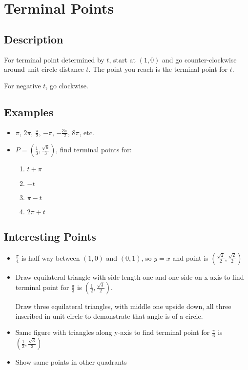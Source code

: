 \documentclass{exam}
\begin{document}
  \section{Terminal Points}

  \subsection{Description}
  For terminal point determined by $t$, start at $(1, 0)$ and go counter-clockwise around unit circle distance $t$.  The
  point you reach is the terminal point for $t$.

  For negative $t$, go clockwise.

  \subsection{Examples}
  \begin{itemize}
    \item $\pi$, $2 \pi$, $\frac{\pi}{2}$, $-\pi$, $-\frac{3 \pi}{2}$, $8 \pi$, etc.
    \item $P = \left( \frac{1}{3}, \frac{\sqrt{6}}{3} \right)$, find terminal points for:
      \begin{enumerate}[a]
        \item $t + \pi$
        \item $-t$
        \item $\pi - t$
        \item $2 \pi + t$
      \end{enumerate}
  \end{itemize}

  \subsection{Interesting Points}

  \begin{itemize}
    \item $\frac{\pi}{4}$ is half way between $(1, 0)$ and $(0, 1)$, so $y = x$ and point is 
      $\left( \frac{\sqrt{2}}{2}, \frac{\sqrt{2}}{2} \right)$

    \item Draw equilateral triangle with side length one and one side on x-axis to find terminal point for
      $\frac{\pi}{3}$ is $\left( \frac{1}{2}, \frac{\sqrt{3}}{2} \right)$.

      Draw three equilateral triangles, with middle one upside down, all three inscribed in unit circle to demonstrate
      that angle is  of a circle.  

    \item Same figure with triangles along y-axis to find terminal point for $\frac{\pi}{6}$ 
      is $\left( \frac{1}{2}, \frac{\sqrt{3}}{2} \right)$

    \item Show same points in other quadrants

  \end{itemize}
\end{document}
